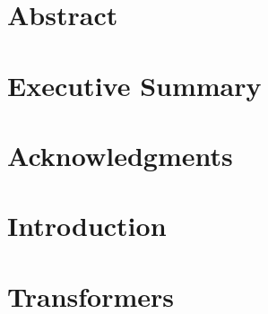 \documentclass[12pt, oneside]{book}
\begin{document}
\chapter{Abstract}

\chapter{Executive Summary}


\chapter{Acknowledgments}


\tableofcontents

\listoffigures

\mainmatter

\chapter{Introduction}
% 

% 


\chapter{Transformers}


\appendix
\end{document}
